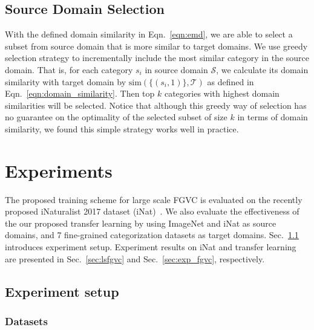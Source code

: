 \documentclass[10pt,twocolumn,letterpaper]{article}
\begin{document}
\subsection{Source Domain Selection}
\label{sec:selection}

With the defined domain similarity in Eqn.\ \ref{eqn:emd}, we are able to select a subset from source domain that is more similar to target domains.
We use greedy selection strategy to incrementally include the most similar category in the source domain.
That is, for each category $s_i$ in source domain $\mathcal{S}$, we calculate its domain similarity with target domain by $\text{sim}(\{(s_i, 1)\}, \mathcal{T})$ as defined in Eqn.\ \ref{eqn:domain_similarity}.
Then top $k$ categories with highest domain similarities will be selected.
Notice that although this greedy way of selection has no guarantee on the optimality of the selected subset of size $k$ in terms of domain similarity, we found this simple strategy works well in practice.








\section{Experiments}
\label{sec:experiments}

The proposed training scheme for large scale FGVC is evaluated on the recently proposed iNaturalist 2017 dataset (iNat)~\cite{inaturalist}.
We also evaluate the effectiveness of the our proposed transfer learning by using ImageNet and iNat as source domains, and 7 fine-grained categorization datasets as target domains.
Sec.\ \ref{sec:exp_setup} introduces experiment setup.
Experiment results on iNat and transfer learning are presented in Sec.\ \ref{sec:lsfgvc} and Sec.\ \ref{sec:exp_fgvc}, respectively.

\subsection{Experiment setup}
\label{sec:exp_setup}


\subsubsection{Datasets}
\label{sec:exp_datasets}
\end{document}
